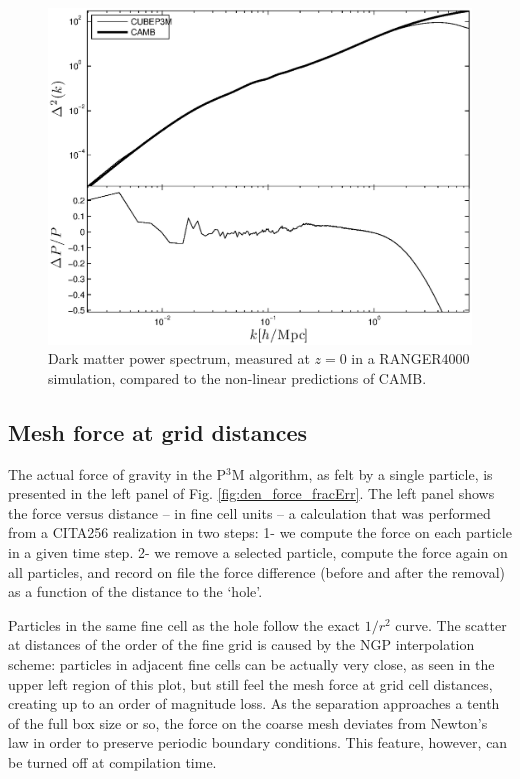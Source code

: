 \begin{figure}%
  \begin{center}
    \includegraphics[width=5.2in]{graphs/power_highres.eps}
  \caption{Dark matter power spectrum, measured at $z=0$ in a RANGER4000 simulation,
  compared to the non-linear predictions of {\small CAMB}.
    \label{fig:power_highres}}
\end{center}
\end{figure}

\subsection{Mesh force at grid distances}
\label{subsec:force}

The actual force of gravity in the P$^3$M algorithm,
as felt by a single particle, is presented in the left panel of Fig. \ref{fig:den_force_fracErr}.
The left panel shows the force versus distance -- in fine cell units -- a calculation that was performed from a CITA256 realization in two steps: 
1- we compute the force on each particle in a given time step.
2- we remove a selected particle, compute the force again on all particles, and record on file the 
force difference (before  and after the removal) as a function of the distance to the `hole'.

Particles in the same fine cell as the hole follow the exact $1/r^{2}$ curve. The scatter at 
  distances of the order of the fine grid is caused by the NGP interpolation scheme:
  particles in adjacent fine cells can be actually very close, as seen in the upper left region of this plot,
  but still feel the mesh force at grid cell distances,
  creating up to an order of magnitude loss.
As the separation approaches a tenth of the full box size or so, the force on the coarse mesh deviates
from Newton's law in order to preserve periodic boundary conditions. 
This feature, however, can be turned off at compilation time.


